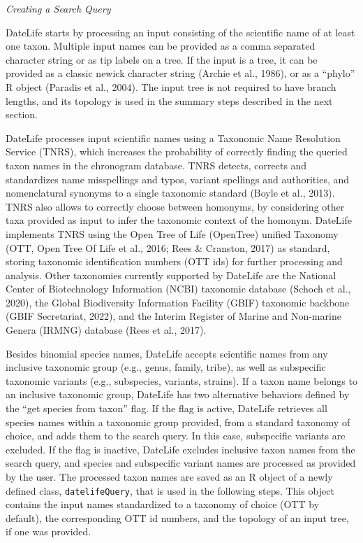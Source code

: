 \documentclass[english,man]{apa6}
\begin{document}
\begin{center}
\emph{Creating a Search Query}
\end{center}

DateLife starts by processing an input consisting of the scientific name of at least one taxon. Multiple input names can be provided as a comma separated character string or as tip labels on a tree.
If the input is a tree, it can be provided as a classic newick character string (Archie et al., 1986), or as a \enquote{phylo} R object (Paradis et al., 2004).
The input tree is not required to have branch lengths, and its topology is used in the summary steps described in the next section.

DateLife processes input scientific names using a Taxonomic Name Resolution Service (TNRS), which increases the probability of correctly finding the queried taxon names in the chronogram database. TNRS detects, corrects and standardizes name misspellings and typos, variant spellings and authorities, and nomenclatural synonyms to a single taxonomic standard (Boyle et al., 2013). TNRS also allows to correctly choose between homonyms, by considering other taxa provided as input to infer the taxonomic context of the homonym. DateLife implements TNRS using the Open Tree of Life (OpenTree) unified Taxonomy (OTT, Open Tree Of Life et al., 2016; Rees \& Cranston, 2017) as standard, storing taxonomic identification numbers (OTT ids) for further processing and analysis. Other taxonomies currently supported by DateLife are the National Center of Biotechnology Information (NCBI) taxonomic database (Schoch et al., 2020), the Global Biodiversity Information Facility (GBIF) taxonomic backbone (GBIF Secretariat, 2022), and the Interim Register of Marine and Non-marine Genera (IRMNG) database (Rees et al., 2017).

Besides binomial species names, DateLife accepts scientific names from any inclusive taxonomic group (e.g., genus, family, tribe), as well as subspecific taxonomic variants (e.g., subspecies, variants, strains). If a taxon name belongs to an inclusive taxonomic group, DateLife has two alternative behaviors defined by the \enquote{get species from taxon} flag. If the flag is active, DateLife retrieves all species names within a taxonomic group provided, from a standard taxonomy of choice, and adds them to the search query. In this case, subspecific variants are excluded.
If the flag is inactive, DateLife excludes inclusive taxon names from the search query, and species and subspecific variant names are processed as provided by the user.
The processed taxon names are saved as an R object of a newly defined class, \texttt{datelifeQuery}, that is used in the following steps. This object contains the input names standardized to a taxonomy of choice (OTT by default), the corresponding OTT id numbers, and the topology of an input tree, if one was provided.
\end{document}
